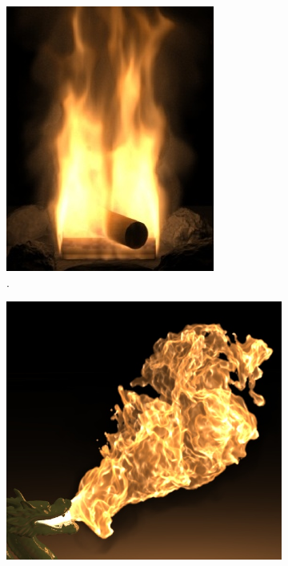 \begin{figure}[htb!]
\begin{subfigure}[t]{0.22\textwidth}
                \includegraphics[width=\textwidth]{img/nguyen_2002}
                \caption{\cite{Nguyen:2002}.}
        \end{subfigure}       
        \quad %
        \begin{subfigure}[t]{0.3\textwidth}
                \includegraphics[width=\textwidth]{img/hong_2007}

\end{subfigure}
\end{figure}
